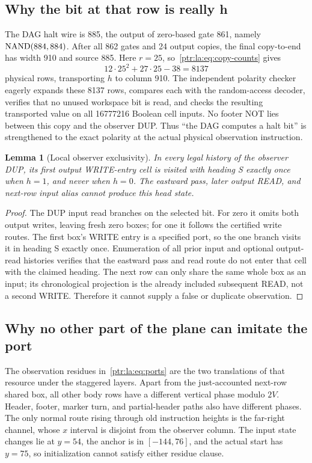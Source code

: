 \documentclass[11pt,letterpaper]{article}
\newtheorem{lemma}[theorem]{Lemma}
\theoremstyle{definition}\newtheorem{definition}[theorem]{Definition}
\theoremstyle{remark}\newtheorem{remark}[theorem]{Remark}
\begin{document}
\subsection{Why the bit at that row is really h}
The DAG halt wire is 885, the output of zero-based gate 861, namely $\operatorname{NAND}(884,884)$. After all 862 gates and 24 output copies, the final copy-to-end has width 910 and source 885. Here $r=25$, so~\eqref{ptr:la:eq:copy-counts} gives
\[
12\cdot25^2+27\cdot25-38=8137
\]
physical rows, transporting $h$ to column 910. The independent polarity checker eagerly expands these 8137 rows, compares each with the random-access decoder, verifies that no unused workspace bit is read, and checks the resulting transported value on all 16777216 Boolean cell inputs. No footer NOT lies between this copy and the observer DUP. Thus ``the DAG computes a halt bit'' is strengthened to the exact polarity at the actual physical observation instruction.

\begin{lemma}[Local observer exclusivity]\label{ptr:la:lem:port}
In every legal history of the observer DUP, its first output WRITE-entry cell is visited with heading S exactly once when $h=1$, and never when $h=0$. The eastward pass, later output READ, and next-row input alias cannot produce this head state.
\end{lemma}
\begin{proof}
The DUP input read branches on the selected bit. For zero it omits both output writes, leaving fresh zero boxes; for one it follows the certified write routes. The first box's WRITE entry is a specified port, so the one branch visits it in heading S exactly once. Enumeration of all prior input and optional output-read histories verifies that the eastward pass and read route do not enter that cell with the claimed heading. The next row can only share the same whole box as an input; its chronological projection is the already included subsequent READ, not a second WRITE. Therefore it cannot supply a false or duplicate observation.
\end{proof}

\subsection{Why no other part of the plane can imitate the port}
The observation residues in~\eqref{ptr:la:eq:ports} are the two translations of that resource under the staggered layers. Apart from the just-accounted next-row shared box, all other body rows have a different vertical phase modulo $2V$. Header, footer, marker turn, and partial-header paths also have different phases. The only normal route rising through old instruction heights is the far-right channel, whose $x$ interval is disjoint from the observer column. The input state changes lie at $y=54$, the anchor is in $[-144,76]$, and the actual start has $y=75$, so initialization cannot satisfy either residue clause.
\end{document}

